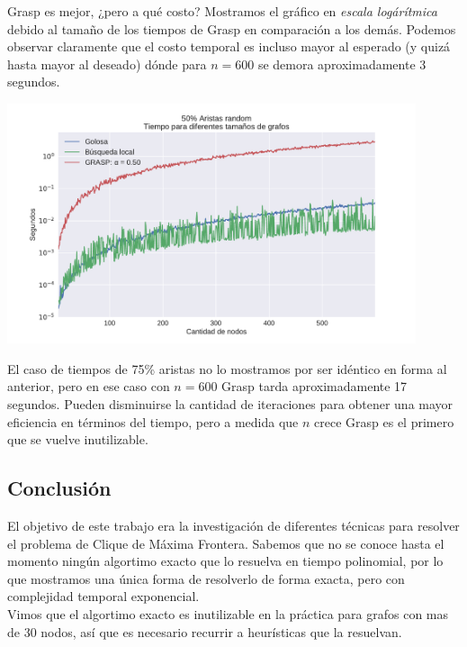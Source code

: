 Grasp es mejor, ¿pero a qué costo? Mostramos el gráfico en \textit{escala logárítmica} debido al tamaño de los tiempos de Grasp en comparación a los demás. Podemos observar claramente que el costo temporal es incluso mayor al esperado (y quizá hasta mayor al deseado) dónde para $n = 600$ se demora aproximadamente 3 segundos.

{\centering
    \includegraphics[width=0.9\textwidth]{informe/imgs/exp_random50_tiempo_todos_ngrande_logy.pdf}
}

El caso de tiempos de 75\% aristas no lo mostramos por ser idéntico en forma al anterior, pero en ese caso con $n = 600$ Grasp tarda aproximadamente 17 segundos. Pueden disminuirse la cantidad de iteraciones para obtener una mayor eficiencia en términos del tiempo, pero a medida que $n$ crece Grasp es el primero que se vuelve inutilizable.



\subsection{Conclusión}

El objetivo de este trabajo era la investigación de diferentes técnicas para resolver el problema de Clique de Máxima Frontera. Sabemos que no se conoce hasta el momento ningún algortimo exacto que lo resuelva en tiempo polinomial, por lo que mostramos una única forma de resolverlo de forma exacta, pero con complejidad temporal exponencial. \\

Vimos que el algortimo exacto es inutilizable en la práctica para grafos con mas de 30 nodos, así que es necesario recurrir a heurísticas que la resuelvan. \\

